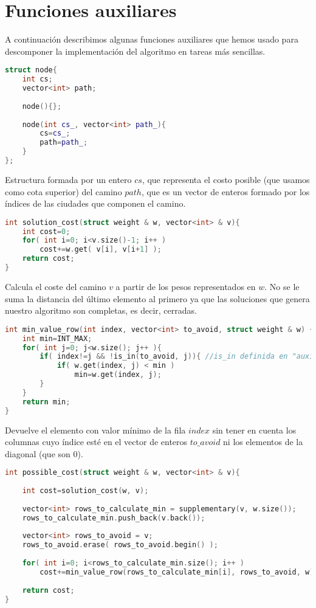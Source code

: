 \documentclass[11pt]{article}
\begin{document}
\section{Funciones auxiliares}

A continuación describimos algunas funciones auxiliares que hemos usado para descomponer la implementación del algoritmo en tareas más sencillas.

\begin{lstlisting}[language=C++, caption=Representación de los nodos]
struct node{
	int cs;
	vector<int> path;
	
	node(){};
	
	node(int cs_, vector<int> path_){
		cs=cs_;
		path=path_;
	}
};
\end{lstlisting}

Estructura formada por un entero $cs$, que representa el costo posible (que usamos como cota superior) del camino $path$, que es un vector de enteros formado por los índices de las ciudades que componen el camino.

\begin{lstlisting}[language=C++, caption=Cálculo del coste]
int solution_cost(struct weight & w, vector<int> & v){
	int cost=0;
	for( int i=0; i<v.size()-1; i++ )
		cost+=w.get( v[i], v[i+1] );
	return cost;
}
\end{lstlisting}

Calcula el coste del camino $v$ a partir de los pesos representados en $w$. No se le suma la distancia del último elemento al primero ya que las soluciones que genera nuestro algoritmo son completas, es decir, cerradas.

\begin{lstlisting}[language=C++, caption=Mínimo por filas]
int min_value_row(int index, vector<int> to_avoid, struct weight & w) {
	int min=INT_MAX;
	for( int j=0; j<w.size(); j++ ){
		if( index!=j && !is_in(to_avoid, j)){ //is_in definida en "auxiliar.cpp"
			if( w.get(index, j) < min )
				min=w.get(index, j);
		}
	}
	return min;
}

\end{lstlisting}

Devuelve el elemento con valor mínimo de la fila $index$ sin tener en cuenta los columnas cuyo índice esté en el vector de enteros $to\_avoid$ ni los elementos de la diagonal (que son 0).

\begin{lstlisting}[language=C++, caption=Calculo del costo posible]
int possible_cost(struct weight & w, vector<int> & v){
	
	int cost=solution_cost(w, v);
	
	vector<int> rows_to_calculate_min = supplementary(v, w.size());
	rows_to_calculate_min.push_back(v.back());
	
	vector<int> rows_to_avoid = v;
	rows_to_avoid.erase( rows_to_avoid.begin() );
	
	for( int i=0; i<rows_to_calculate_min.size(); i++ )
		cost+=min_value_row(rows_to_calculate_min[i], rows_to_avoid, w);
	
	return cost;
}
\end{lstlisting}
\end{document}
